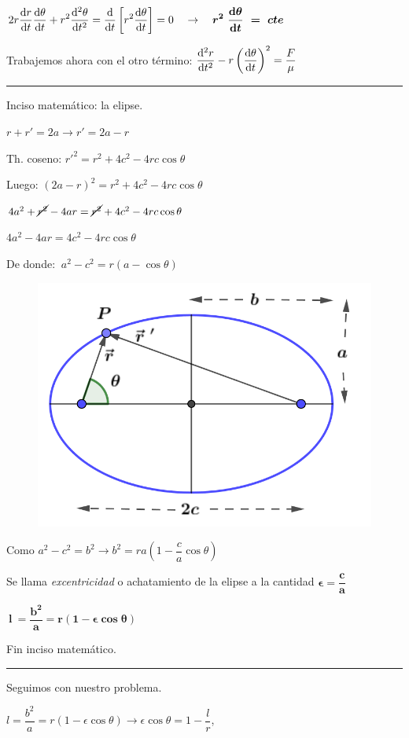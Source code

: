 $\displaystyle 2r \dv{r}{t}\dv{\theta}{t}+r^2\dv[2]{\theta}{t}= \dv{t}\left[r^2 \dv{\theta}{t} \right] =0  \quad \to \quad \boldsymbol{r^2\  \dv{\theta}{t}\ =\ cte}$

Trabajemos ahora con el otro término: $\displaystyle \dv[2]{r}{t}- r\left(\dv{\theta}{t} \right)^2 =\dfrac F \mu $

\vspace{3mm} %
\textcolor{gris}{\rule{60mm}{0.4pt}
\hspace{5mm} Inciso matemático: la elipse.}
\begin{multicols}{2}
$r+r'=2a \to r'=2a-r$

Th. coseno: $r'^2=r^2+4c^2-4rc\cos \theta$

Luego: $(2a-r)^2=r^2+4c^2-4rc\cos \theta$	

$4a^2 + \cancel{r^2} -4ar=\cancel{r^2}+4c^2-4rc\cos \theta$

$4a^2  -4ar=4c^2-4rc\cos \theta$

De donde: $\ a^2-c^2=r(a-\cos \theta)$
\begin{figure}[H]
	\centering
	\includegraphics[width=.45\textwidth]{imagenes/imagenes14/T14IM05.png}
\end{figure}
\end{multicols}

Como $a^2-c^2=b^2 \to b^2=ra\left(1-\dfrac c a \cos \theta \right)$

Se llama \emph{excentricidad} o achatamiento de la elipse a la cantidad $\boldsymbol{ \epsilon=\dfrac c a }$

$\boldsymbol{ \ l \ = \dfrac{b^2}{a}=r\left(1-\epsilon \cos \theta \right) }$

\textcolor{gris}{ Fin inciso matemático. \hspace{5mm} \rule{67mm}{0.4pt} }
\vspace{3mm} %

Seguimos con nuestro problema.

$l =\dfrac{b^2}{a}=r\left(1-\epsilon\cos \theta \right) \to \epsilon \cos \theta=1-\dfrac l r $, 

